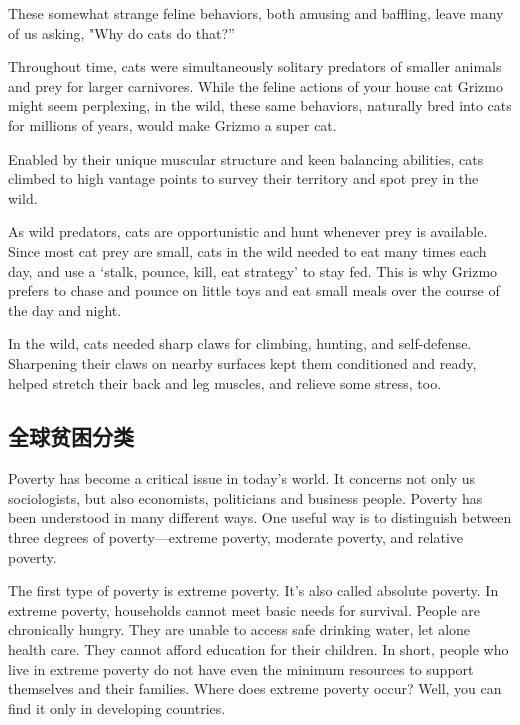 These somewhat strange feline behaviors, both amusing and baffling, leave many of us asking, "Why do cats do that?”

Throughout time, cats were simultaneously solitary predators of smaller animals and prey for larger carnivores. While the feline actions of your house cat Grizmo might seem perplexing, in the wild, these same behaviors, naturally bred into cats for millions of years, would make Grizmo a super cat.

Enabled by their unique muscular structure and keen balancing abilities, cats climbed to high vantage points to survey their territory and spot prey in the wild.

As wild predators, cats are opportunistic and hunt whenever prey is available. Since most cat prey are small, cats in the wild needed to eat many times each day, and use a ‘stalk, pounce, kill, eat strategy' to stay fed. This is why Grizmo prefers to chase and pounce on little toys and eat small meals over the course of the day and night.

In the wild, cats needed sharp claws for climbing, hunting, and self-defense. Sharpening their claws on nearby surfaces kept them conditioned and ready, helped stretch their back and leg muscles, and relieve some stress, too.

\subsection{全球贫困分类}
\begin{margintable}\vspace{-2cm}\footnotesize
\end{margintable}
Poverty has become a critical issue in today's world. It concerns not only us sociologists, but also economists, politicians and business people. Poverty has been understood in many different ways. One useful way is to distinguish between three degrees of poverty—extreme poverty, moderate poverty, and relative poverty.

The first type of poverty is extreme poverty. It's also called absolute poverty. In extreme poverty, households cannot meet basic needs for survival. People are chronically hungry. They are unable to access safe drinking water, let alone health care. They cannot afford education for their children. In short, people who live in extreme poverty do not have even the minimum resources to support themselves and their families. Where does extreme poverty occur? Well, you can find it only in developing countries.

